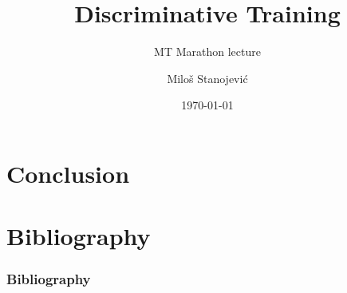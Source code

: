 \documentclass[table]{beamer}
\begin{document}
\title{Discriminative Training}
\subtitle{MT Marathon lecture}
\author{Milo\v{s} Stanojevi\'{c}}
\date{\today} 


\frame{\titlepage} 




%











\section{Conclusion}



%

\section{Bibliography}
\begin{frame}[allowframebreaks]
\tiny
\frametitle{Bibliography}


\end{frame}
\end{document}
